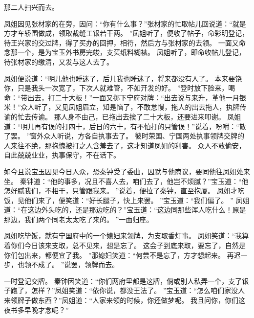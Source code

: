 那二人扫兴而去。
\par
凤姐因见张材家的在旁，因问：“你有什么事？”张材家的忙取帖儿回说道：“就是方才车轿围做成，领取裁缝工银若干两。
”凤姐听了，便收了帖子，命彩明登记，待王兴家的交过牌，得了买办的回押，相符，然后方与张材家的去领。
一面又命念那一个，是为宝玉外书房完竣，支买纸料糊裱。
凤姐听了，即命收帖儿登记，待张材家的缴清，又发与这人去了。
\par
凤姐便说道：“明儿他也睡迷了，后儿我也睡迷了，将来都没有人了。
本来要饶你，只是我头一次宽了，下次人就难管，不如开发的好。
”登时放下脸来，喝命：“带出去，打二十大板！”一面又掷下宁府对牌：“出去说与来升，革他一月银米！”众人听了，又见凤姐眉立，知是恼了，不敢怠慢，拖人的出去拖人，执牌传谕的忙去传谕。
那人身不由己，已拖出去挨了二十大板，还要进来叩谢。
凤姐道：“明儿再有误的打四十，后日的六十，有不怕打的只管误！”说着，吩咐：“散了罢。
”窗外众人听说，方各自执事去了。
彼时荣国、宁国两处执事领牌交牌的人来往不绝，那抱愧被打之人含羞去了，这才知道凤姐的利害。
众人不敢偷安，自此兢兢业业，执事保守，不在话下。
\par
如今且说宝玉因见今日人众，恐秦钟受了委曲，因默与他商议，要同他往凤姐处来坐。
秦钟道：“他的事多，况且不喜人去，咱们去了，他岂不烦腻？”宝玉道：“他怎好腻我们，不相干，只管跟我来。
”说着，便拉了秦钟，直至抱厦。
凤姐才吃饭，见他们来了，便笑道：“好长腿子，快上来罢。
”宝玉道：“我们偏了。
”
凤姐道：“在这边外头吃的，还是那边吃的？”宝玉道：“这边同那些浑人吃什么！原是那边，我们两个同老太太吃了来的。
”一面归座。
\par
凤姐吃毕饭，就有宁国府中的一个媳妇来领牌，为支取香灯事。
凤姐笑道：“我算着你们今日该来支取，总不见来，想是忘了。
这会子到底来取，要忘了，自然是你们包出来，都便宜了我。
”那媳妇笑道：“何尝不是忘了，方才想起来。
再迟一步，也领不成了。
”说罢，领牌而去。
\par
一时登记交牌。
秦钟因笑道：“你们两府里都是这牌，倘或别人私弄一个，支了银子跑了，怎样？”凤姐笑道：“依你说，都没王法了。
”宝玉道：“怎么咱们家没人来领牌子做东西？”凤姐道：“人家来领的时候，你还做梦呢。
我且问你，你们这夜书多早晚才念呢？”
